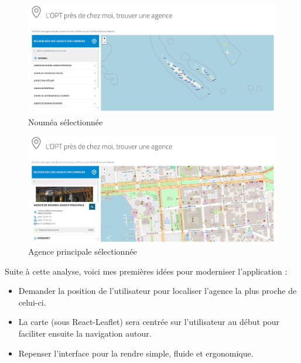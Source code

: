\documentclass[12pt,a4paper]{report}
\begin{document}
\begin{figure}[h] %
    \centering
    \includegraphics[width=1\textwidth]{ressources_rapport/ancien_app_opt_noumea.JPG}
    \caption{Nouméa sélectionnée}
\end{figure}
\vspace{1cm}

\begin{figure}[h] %
    \centering
    \includegraphics[width=1\textwidth]{ressources_rapport/ancien_app_opt_noumea_agence_principale.JPG}
    \caption{Agence principale sélectionnée}
\end{figure}
\vspace{2cm}
Suite à cette analyse, voici mes premières idées pour moderniser l'application :
\begin{itemize}
    \item Demander la position de l'utilisateur pour localiser l'agence la plus proche de celui-ci.
    \item La carte (sous React-Leaflet) sera centrée sur l'utilisateur au début pour faciliter ensuite la navigation autour.
    \item Repenser l'interface pour la rendre simple, fluide et ergonomique.
\end{itemize}

\newpage
\end{document}
